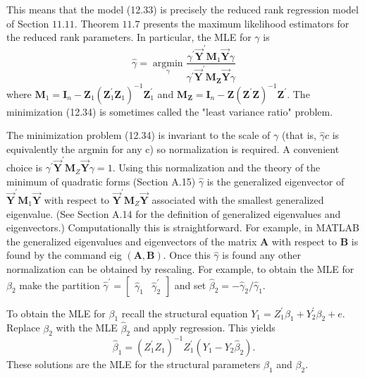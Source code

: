 \documentclass[10pt]{article}
\begin{document}
This means that the model (12.33) is precisely the reduced rank regression model of Section $11.11 .$ Theorem $11.7$ presents the maximum likelihood estimators for the reduced rank parameters. In particular, the MLE for $\gamma$ is
$$
\widehat{\gamma}=\underset{\gamma}{\operatorname{argmin}} \frac{\gamma^{\prime} \overrightarrow{\boldsymbol{Y}}^{\prime} \boldsymbol{M}_{1} \overrightarrow{\boldsymbol{Y}} \gamma}{\gamma^{\prime} \overrightarrow{\boldsymbol{Y}}^{\prime} \boldsymbol{M}_{\boldsymbol{Z}} \overrightarrow{\boldsymbol{Y}} \gamma}
$$
where $\boldsymbol{M}_{1}=\boldsymbol{I}_{n}-\boldsymbol{Z}_{1}\left(\boldsymbol{Z}_{1}^{\prime} \boldsymbol{Z}_{1}\right)^{-1} \boldsymbol{Z}_{1}^{\prime}$ and $\boldsymbol{M}_{\boldsymbol{Z}}=\boldsymbol{I}_{n}-\boldsymbol{Z}\left(\boldsymbol{Z}^{\prime} \boldsymbol{Z}\right)^{-1} \boldsymbol{Z}^{\prime}$. The minimization (12.34) is sometimes called the "least variance ratio" problem.

The minimization problem (12.34) is invariant to the scale of $\gamma$ (that is, $\widehat{\gamma} c$ is equivalently the argmin for any c) so normalization is required. A convenient choice is $\gamma^{\prime} \overrightarrow{\boldsymbol{Y}}^{\prime} \boldsymbol{M}_{Z} \overrightarrow{\boldsymbol{Y}} \gamma=1$. Using this normalization and the theory of the minimum of quadratic forms (Section A.15) $\widehat{\gamma}$ is the generalized eigenvector of $\overrightarrow{\boldsymbol{Y}}^{\prime} \boldsymbol{M}_{1} \overrightarrow{\boldsymbol{Y}}$ with respect to $\overrightarrow{\boldsymbol{Y}}^{\prime} \boldsymbol{M}_{Z} \overrightarrow{\boldsymbol{Y}}$ associated with the smallest generalized eigenvalue. (See Section A.14 for the definition of generalized eigenvalues and eigenvectors.) Computationally this is straightforward. For example, in MATLAB the generalized eigenvalues and eigenvectors of the matrix $\boldsymbol{A}$ with respect to $\boldsymbol{B}$ is found by the command eig $(\boldsymbol{A}, \boldsymbol{B})$. Once this $\widehat{\gamma}$ is found any other normalization can be obtained by rescaling. For example, to obtain the MLE for $\beta_{2}$ make the partition $\widehat{\gamma}^{\prime}=\left[\begin{array}{cc}\widehat{\gamma}_{1} & \widehat{\gamma}_{2}^{\prime}\end{array}\right]$ and set $\widehat{\beta}_{2}=-\widehat{\gamma}_{2} / \widehat{\gamma}_{1}$.

To obtain the MLE for $\beta_{1}$ recall the structural equation $Y_{1}=Z_{1}^{\prime} \beta_{1}+Y_{2}^{\prime} \beta_{2}+e$. Replace $\beta_{2}$ with the MLE $\widehat{\beta}_{2}$ and apply regression. This yields
$$
\widehat{\beta}_{1}=\left(Z_{1}^{\prime} Z_{1}\right)^{-1} Z_{1}^{\prime}\left(Y_{1}-Y_{2} \widehat{\beta}_{2}\right) .
$$
These solutions are the MLE for the structural parameters $\beta_{1}$ and $\beta_{2}$.
\end{document}
